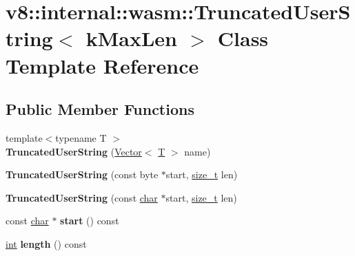 \hypertarget{classv8_1_1internal_1_1wasm_1_1TruncatedUserString}{}\section{v8\+:\+:internal\+:\+:wasm\+:\+:Truncated\+User\+String$<$ k\+Max\+Len $>$ Class Template Reference}
\label{classv8_1_1internal_1_1wasm_1_1TruncatedUserString}
\subsection*{Public Member Functions}
\begin{DoxyCompactItemize}
\item 
\mbox{\label{classv8_1_1internal_1_1wasm_1_1TruncatedUserString_adfb375f34f22db16dc7e526ab019929b}} 
{\footnotesize template$<$typename T $>$ }\\{\bfseries Truncated\+User\+String} (\mbox{\hyperlink{classv8_1_1internal_1_1Vector}{Vector}}$<$ \mbox{\hyperlink{classv8_1_1internal_1_1torque_1_1T}{T}} $>$ name)
\item 
\mbox{\label{classv8_1_1internal_1_1wasm_1_1TruncatedUserString_a39161cacf20e26dd022920e426da719d}} 
{\bfseries Truncated\+User\+String} (const byte $\ast$start, \mbox{\hyperlink{classsize__t}{size\+\_\+t}} len)
\item 
\mbox{\label{classv8_1_1internal_1_1wasm_1_1TruncatedUserString_ad9ce397282ab85bf8b6819220efd9b46}} 
{\bfseries Truncated\+User\+String} (const \mbox{\hyperlink{classchar}{char}} $\ast$start, \mbox{\hyperlink{classsize__t}{size\+\_\+t}} len)
\item 
\mbox{\label{classv8_1_1internal_1_1wasm_1_1TruncatedUserString_adb72b8e73e3ea6d213c58dff3067c886}} 
const \mbox{\hyperlink{classchar}{char}} $\ast$ {\bfseries start} () const
\item 
\mbox{\label{classv8_1_1internal_1_1wasm_1_1TruncatedUserString_a256208061d70fea2f990c0dbaf085b6d}} 
\mbox{\hyperlink{classint}{int}} {\bfseries length} () const
\end{DoxyCompactItemize}


